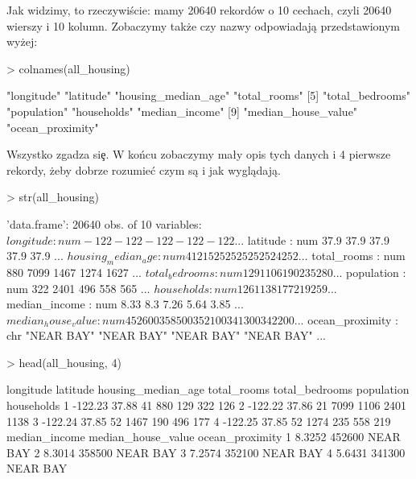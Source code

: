 \documentclass{article}
\begin{document}
\noindent
\quad Jak widzimy, to rzeczywiście: mamy 20640 rekordów o 10 cechach, czyli 20640 wierszy i 10 kolumn. Zobaczymy także czy nazwy odpowiadają przedstawionym wyżej:

\begin{Schunk}
\begin{Sinput}
> colnames(all_housing)
\end{Sinput}
\begin{Soutput}
 [1] "longitude"          "latitude"           "housing_median_age" "total_rooms"       
 [5] "total_bedrooms"     "population"         "households"         "median_income"     
 [9] "median_house_value" "ocean_proximity"   
\end{Soutput}
\end{Schunk}

\noindent
\quad Wszystko zgadza si\c e. W końcu zobaczymy ma\l y opis tych danych i 4 pierwsze rekordy, żeby dobrze rozumie\'c czym są i jak wyglądają.

\begin{Schunk}
\begin{Sinput}
> str(all_housing)
\end{Sinput}
\begin{Soutput}
'data.frame':	20640 obs. of  10 variables:
 $ longitude         : num  -122 -122 -122 -122 -122 ...
 $ latitude          : num  37.9 37.9 37.9 37.9 37.9 ...
 $ housing_median_age: num  41 21 52 52 52 52 52 52 42 52 ...
 $ total_rooms       : num  880 7099 1467 1274 1627 ...
 $ total_bedrooms    : num  129 1106 190 235 280 ...
 $ population        : num  322 2401 496 558 565 ...
 $ households        : num  126 1138 177 219 259 ...
 $ median_income     : num  8.33 8.3 7.26 5.64 3.85 ...
 $ median_house_value: num  452600 358500 352100 341300 342200 ...
 $ ocean_proximity   : chr  "NEAR BAY" "NEAR BAY" "NEAR BAY" "NEAR BAY" ...
\end{Soutput}
\end{Schunk}

\begin{Schunk}
\begin{Sinput}
> head(all_housing, 4)
\end{Sinput}
\begin{Soutput}
  longitude latitude housing_median_age total_rooms total_bedrooms population households
1   -122.23    37.88                 41         880            129        322        126
2   -122.22    37.86                 21        7099           1106       2401       1138
3   -122.24    37.85                 52        1467            190        496        177
4   -122.25    37.85                 52        1274            235        558        219
  median_income median_house_value ocean_proximity
1        8.3252             452600        NEAR BAY
2        8.3014             358500        NEAR BAY
3        7.2574             352100        NEAR BAY
4        5.6431             341300        NEAR BAY
\end{Soutput}
\end{Schunk}
\end{document}
